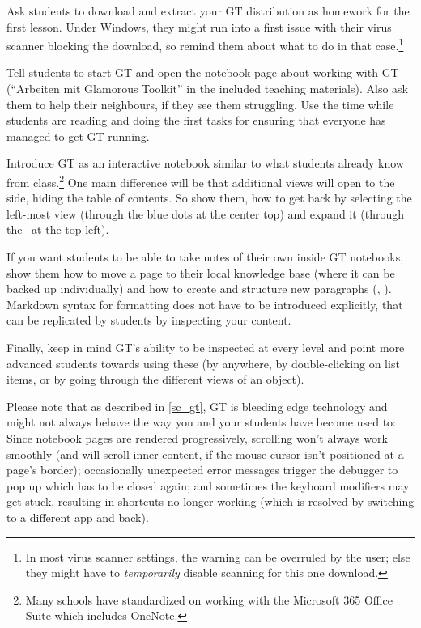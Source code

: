 \begin{instructions}
\item Ask students to download and extract your \ac{GT} distribution as homework for the first lesson. Under Windows, they might run into a first issue with their virus scanner blocking the download, so remind them about what to do in that case.\footnote{In most virus scanner settings, the warning can be overruled by the user; else they might have to \emph{temporarily} disable scanning for this one download.}
\item Tell students to start \ac{GT} and open the notebook page about working with \ac{GT} (``Arbeiten mit Glamorous Toolkit'' in the included teaching materials). Also ask them to help their neighbours, if they see them struggling. Use the time while students are reading and doing the first tasks for ensuring that everyone has managed to get \ac{GT} running.
\item Introduce \ac{GT} as an interactive notebook similar to what students already know from class.\footnote{Many schools have standardized on working with the Microsoft 365 Office Suite which includes OneNote.} One main difference will be that additional views will open to the side, hiding the table of contents. So show them, how to get back by selecting the left-most view (through the blue dots at the center top) and expand it (through the \faPlusCircle\ at the top left).
\item If you want students to be able to take notes of their own inside \ac{GT} notebooks, show them how to move a page to their local knowledge base (where it can be backed up individually) and how to create and structure new paragraphs (, ). Markdown syntax for formatting does not have to be introduced explicitly, that can be replicated by students by inspecting your content.
\item Finally, keep in mind \ac{GT}'s ability to be inspected at every level and point more advanced students towards using these (\eg by  anywhere, by double-clicking on list items, or by going through the different views of an object).
\end{instructions}

Please note that as described in \ref{sc_gt}, \ac{GT} is bleeding edge technology and might not always behave the way you and your students have become used to: Since notebook pages are rendered progressively, scrolling won't always work smoothly (and will scroll inner content, if the mouse cursor isn't positioned at a page's border); occasionally unexpected error messages trigger the debugger to pop up which has to be closed again; and sometimes the keyboard modifiers may get stuck, resulting in shortcuts no longer working (which is resolved by switching to a different app and back).


